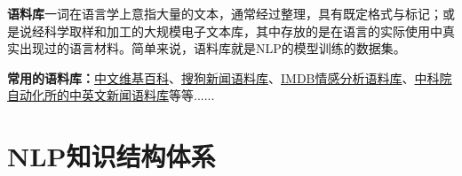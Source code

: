 \documentclass[UTF8]{ctexart}
\begin{document}
\textbf{语料库}一词在语言学上意指大量的文本，通常经过整理，具有既定格式与标记；或是说经科学取样和加工的大规模电子文本库，其中存放的是在语言的实际使用中真实出现过的语言材料。简单来说，语料库就是NLP的模型训练的数据集。

\textbf{常用的语料库：}\href{https://dumps.wikimedia.org/zhwiki/}{中文维基百科}、\href{http://download.labs.sogou.com/resource/ca.php}{搜狗新闻语料库}、\href{https://www.kaggle.com/tmdb-movie-metadata}{IMDB情感分析语料库}、\href{http://www.datatang.com/data/13484}{中科院自动化所的中英文新闻语料库}等等......



\section{NLP知识结构体系}
\end{document}
